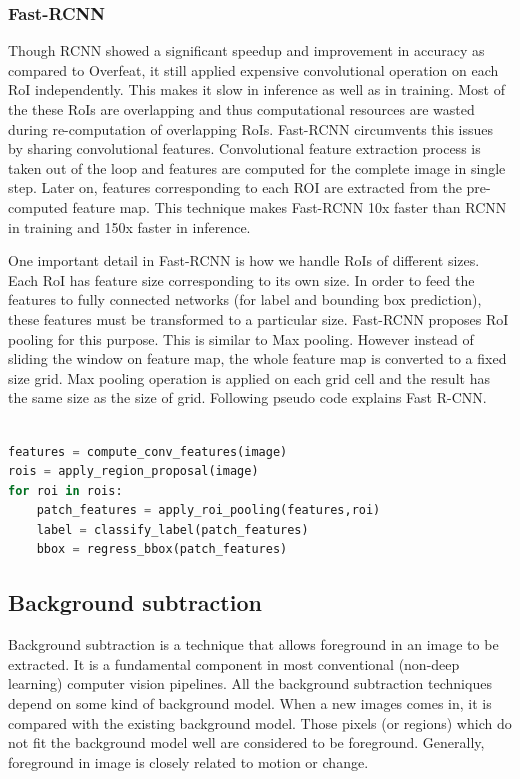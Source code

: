 \subsubsection{Fast-RCNN}
Though RCNN showed a significant speedup and improvement in accuracy as compared to Overfeat, it still applied expensive convolutional operation on each RoI independently. This makes it slow in inference as well as in training. Most of the these RoIs are overlapping and thus computational resources are wasted during re-computation of overlapping RoIs.  Fast-RCNN\cite{ref_fastrcnn} circumvents this issues by sharing convolutional features. Convolutional feature extraction process is taken out of the loop and features are computed for the complete image in single step. Later on, features corresponding to each ROI are extracted from the pre-computed feature map. This technique 
makes Fast-RCNN 10x faster than RCNN in training and 150x faster in inference.

One important detail in Fast-RCNN is how we handle RoIs of different sizes. Each RoI has feature size corresponding to its own size. In order to feed the features to fully connected networks (for label and bounding box prediction), these features must be transformed to a particular size.  Fast-RCNN proposes RoI pooling for this purpose. This is similar to Max pooling. However instead of sliding the window on feature map, the whole feature map is converted to a fixed size grid. Max pooling operation is applied on each grid cell and the result has the same size as the size of grid. Following pseudo code explains Fast R-CNN.

\begin{lstlisting}[language=Python, caption=Fast-RCNN pseudo code]

features = compute_conv_features(image)
rois = apply_region_proposal(image)
for roi in rois:
    patch_features = apply_roi_pooling(features,roi)
    label = classify_label(patch_features)
    bbox = regress_bbox(patch_features)
\end{lstlisting}

\subsection{Background subtraction}
Background subtraction is a technique that allows foreground in an image to be extracted. It is a fundamental component in  most conventional (non-deep learning) computer vision pipelines. All the background subtraction techniques depend on some kind of background model. When a new images comes in, it is compared with the existing background model. Those pixels (or regions) which do not fit the background model well are considered to be foreground. Generally, foreground in image is closely related to motion or change. 

